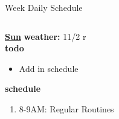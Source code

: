 {{\begin{block}{Week Daily Schedule}
\begin{columns}
          \begin{column}{0.15\textwidth}{\small \underline{\bf Sun}}
            {\small \bf weather: } 11/2 r \\ 
            {\small {\bf todo}}\\ 
            \begin{itemize}
              \tiny \item \tiny Add in schedule
            \end{itemize} 
                {\small {\bf schedule}}\\
                \begin{enumerate} 
                  \tiny \item \tiny 8-9AM: Regular Routines 
                \end{enumerate}
          \end{column}

        \end{columns}
      \end{block}

}
 

}
